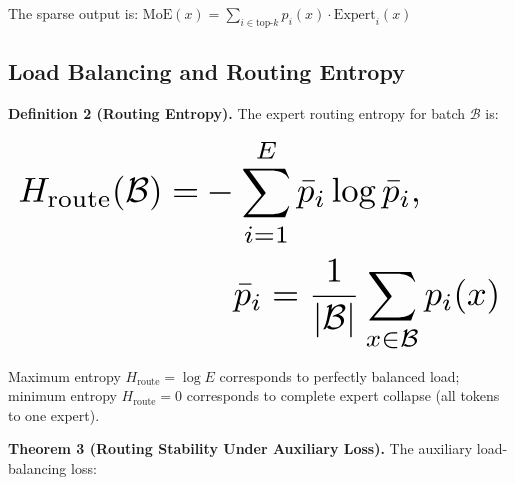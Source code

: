 \documentclass[10pt,twocolumn,letterpaper]{article}
\begin{document}
The sparse output is: $\text{MoE}(x) = \sum_{i \in \text{top-}k} p_i(x) \cdot \text{Expert}_i(x)$


\subsection{Load Balancing and Routing Entropy}


\textbf{Definition 2 (Routing Entropy).} The expert routing entropy for batch $\mathcal{B}$ is:























\begin{equation}
\resizebox{\columnwidth}{!}{$\displaystyle
\begin{aligned}
H_{\text{route}}(\mathcal{B}) = & -\sum_{i=1}^E \bar{p}_i \log \bar{p}_i, \\
& \quad \bar{p}_i = \frac{1}{|\mathcal{B}|}\sum_{x \in \mathcal{B}} p_i(x)
\end{aligned}
$}
\end{equation}























Maximum entropy $H_{\text{route}} = \log E$ corresponds to perfectly balanced load; minimum entropy $H_{\text{route}} = 0$ corresponds to complete expert collapse (all tokens to one expert).

\textbf{Theorem 3 (Routing Stability Under Auxiliary Loss).} The auxiliary load-balancing loss:
\end{document}
